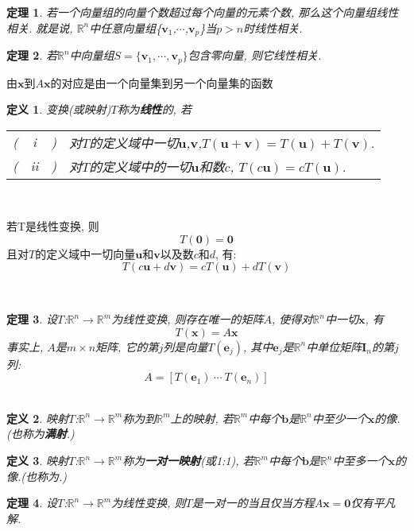 \documentclass[UTF8,fontset=ubuntu]{ctexart}
\theoremstyle{nonumberplain}
\newtheorem{definition}{定义}
\theoremstyle{break}
\newtheorem{theorem}{定理}
\theoremstyle{empty}
\begin{document}
\begin{theorem}
若一个向量组的向量个数超过每个向量的元素个数, 那么这个向量组线性相关. 就是说, $\mathbb{R}^n$中任意向量组\{$\bm{v}_1$,$\cdots$,$\bm{v}_p$\}当$p>n$时线性相关.\\[2ex]
\end{theorem}
\begin{theorem}
若$\mathbb{R}^n$中向量组$S=\{\bm{v}_1,\cdots,\bm{v}_p\}$包含零向量, 则它线性相关.
\end{theorem}
由$\bm{x}$到$A\bm{x}$的对应是由一个向量集到另一个向量集的函数\\
\begin{definition}
变换(或映射)$T$称为\textbf{线性}的, 若\\
\begin{tabular}{l@{}c@{}l@{}l}
( & i & ) & 对$T$的定义域中一切$\bm{u}$,$\bm{v}$,$T(\bm{u}+\bm{v})=T(\bm{u})+T(\bm{v})$.\\
( & ii & ) & 对$T$的定义域中的一切$\bm{u}$和数$c$, $T(c\bm{u})=cT(\bm{u})$.
\end{tabular}\ \\
\end{definition}
\begin{law}
若T是线性变换, 则
\[T(\bm{0})=\bm{0}\]
且对$T$的定义域中一切向量$\bm{u}$和$\bm{v}$以及数$c$和$d$, 有:
\[T(c\bm{u}+d\bm{v})=cT(\bm{u})+dT(\bm{v})\]
\end{law}\ \\
\begin{theorem}
设$T$:$\mathbb{R}^n\rightarrow\mathbb{R}^m$为线性变换, 则存在唯一的矩阵$A$, 使得对$\mathbb{R}^n$中一切$\bm{x}$, 有
\[T(\bm{x})=A\bm{x}\]
事实上, $A$是$m\times n$矩阵, 它的第$j$列是向量$T(\bm{e}_j)$, 其中$\bm{e}_j$是$\mathbb{R}^n$中单位矩阵$\bm{I}_n$的第$j$列:
\[A=[T(\bm{e}_1)\ \cdots\ T(\bm{e}_n)]\]\\
\end{theorem}
\begin{definition}
映射$T$:$\mathbb{R}^n\rightarrow\mathbb{R}^m$称为到$\mathbb{R}^m$上的映射, 若$\mathbb{R}^m$中每个$\bm{b}$是$\mathbb{R}^n$中至少一个$\bm{x}$的像.(也称为\textbf{满射}.)\\
\end{definition}
\begin{definition}
映射$T$:$\mathbb{R}^n\rightarrow\mathbb{R}^m$称为\textbf{一对一映射}(或1:1), 若$\mathbb{R}^m$中每个$\bm{b}$是$\mathbb{R}^n$中至多一个$\bm{x}$的像.(也称为.)\\[2ex]
\end{definition}
\begin{theorem}
设$T$:$\mathbb{R}^n\rightarrow\mathbb{R}^m$为线性变换, 则$T$是一对一的当且仅当方程$A\bm{x}=\bm{0}$仅有平凡解.\\[2ex]
\end{theorem}
\end{document}
